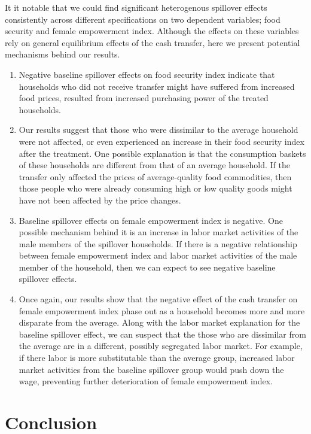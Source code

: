 \documentclass[11pt]{article}
\begin{document}
    It it notable that we could find significant heterogenous spillover effects consistently across different specifications on two dependent variables; food security and female empowerment index. Although the effects on these variables rely on general equilibrium effects of the cash transfer, here we present potential mechanisms behind our results. 
    \begin{enumerate}
    	\item Negative baseline spillover effects on food security index indicate that households who did not receive transfer might have suffered from increased food prices, resulted from increased purchasing power of the treated households. 
    	\item Our results suggest that those who were dissimilar to the average household were not affected, or even experienced an increase in their food security index after the treatment. One possible explanation is that the consumption baskets of these households are different from that of an average household. If the transfer only affected the prices of average-quality food commodities, then those people who were already consuming high or low quality goods might have not been affected by the price changes. 
    	\item Baseline spillover effects on female empowerment index is negative. One possible mechanism behind it is an increase in labor market activities of the male members of the spillover households. If there is a negative relationship between female empowerment index and labor market activities of the male member of the household, then we can expect to see negative baseline spillover effects.  
    	\item Once again, our results show that the negative effect of the cash transfer on female empowerment index phase out as a household becomes more and more disparate from the average. Along with the labor market explanation for the baseline spillover effect, we can suspect that the those who are dissimilar from the average are in a different, possibly segregated labor market. For example, if there labor is more substitutable than the average group, increased labor market activities from the baseline spillover group would push down the wage, preventing further deterioration of female empowerment index. 
    \end{enumerate}

\section{Conclusion}
\end{document}
